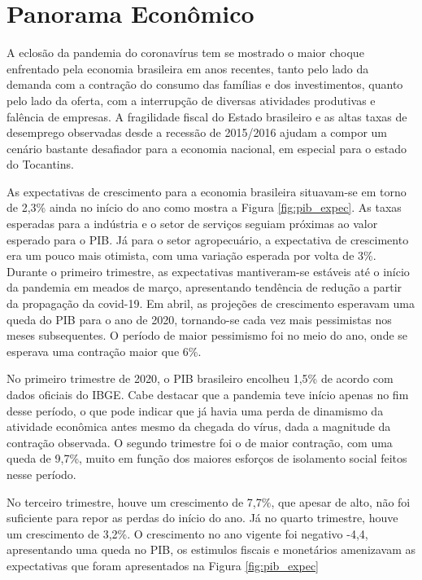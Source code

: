 \documentclass[twocolumn, a4paper, 10pt]{report}
\begin{document}
    
    \hypertarget{panorama-econuxf4mico}{%
    \chapter{Panorama Econômico}\label{panorama-econuxf4mico}}

    A eclosão da pandemia do coronavírus tem se mostrado o maior choque
    enfrentado pela economia brasileira em anos recentes, tanto pelo
    lado da demanda com a contração do consumo das famílias e dos
    investimentos, quanto pelo lado da oferta, com a interrupção de
    diversas atividades produtivas e falência de empresas. A fragilidade
    fiscal do Estado brasileiro e as altas taxas de desemprego
    observadas desde a recessão de 2015/2016 ajudam a compor um cenário
    bastante desafiador para a economia nacional, em especial para o
    estado do Tocantins.

    As expectativas de crescimento para a economia brasileira
    situavam-se em torno de 2,3\% ainda no início do ano como mostra a
    Figura \ref{fig:pib_expec}. As taxas esperadas para a indústria e o
    setor de serviços seguiam próximas ao valor esperado para o PIB. Já
    para o setor agropecuário, a expectativa de crescimento era um pouco
    mais otimista, com uma variação esperada por volta de 3\%. Durante o
    primeiro trimestre, as expectativas mantiveram-se estáveis até o
    início da pandemia em meados de março, apresentando tendência de
    redução a partir da propagação da covid-19. Em abril, as projeções
    de crescimento esperavam uma queda do PIB para o ano de 2020,
    tornando-se cada vez mais pessimistas nos meses subsequentes. O
    período de maior pessimismo foi no meio do ano, onde se esperava uma
    contração maior que 6\%.

    No primeiro trimestre de 2020, o PIB brasileiro encolheu 1,5\% de
    acordo com dados oficiais do IBGE. Cabe destacar que a pandemia teve
    início apenas no fim desse período, o que pode indicar que já havia
    uma perda de dinamismo da atividade econômica antes mesmo da chegada
    do vírus, dada a magnitude da contração observada. O segundo
    trimestre foi o de maior contração, com uma queda de 9,7\%, muito em
    função dos maiores esforços de isolamento social feitos nesse
    período.

    No terceiro trimestre, houve um crescimento de 7,7\%, que apesar de
    alto, não foi suficiente para repor as perdas do início do ano. Já
    no quarto trimestre, houve um crescimento de 3,2\%. O crescimento no
    ano vigente foi negativo -4,4, apresentando uma queda no PIB, os
    estimulos fiscais e monetários amenizavam as expectativas que foram
    apresentados na Figura \ref{fig:pib_expec}
\end{document}
